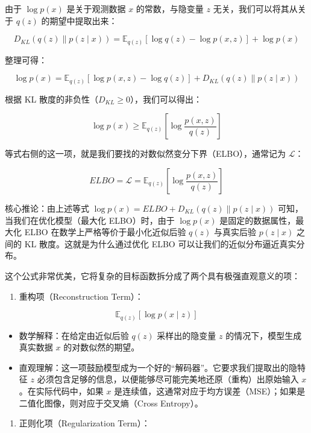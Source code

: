 由于 \(\log p(x)\) 是关于观测数据 \(x\) 的常数，与隐变量 \(z\) 无关，我们可以将其从关于 \(q(z)\) 的期望中提取出来：

\[
D_{KL}(q(z)\parallel p(z\mid x))=\mathbb{E}_{q(z)}[\log q(z)-\log p(x,z)]+\log p(x)
\]

整理可得：

\[
\log p(x)=\mathbb{E}_{q(z)}[\log p(x,z)-\log q(z)]+D_{KL}(q(z)\parallel p(z\mid x))
\]

根据 KL 散度的非负性（\(D_{KL}\ge 0\)），我们可以得出：

\[
\log p(x)\ge \mathbb{E}_{q(z)}\left[\log\frac{p(x,z)}{q(z)}\right]
\]

等式右侧的这一项，就是我们要找的对数似然变分下界（ELBO），通常记为 \(\mathcal{L}\)：

\[
ELBO=\mathcal{L}=\mathbb{E}_{q(z)}\left[\log\frac{p(x,z)}{q(z)}\right]
\]

核心推论：由上述等式 \(\log p(x)=ELBO+D_{KL}(q(z)\parallel p(z\mid x))\) 可知，当我们在优化模型（最大化 ELBO）时，由于 \(\log p(x)\) 是固定的数据属性，最大化 ELBO 在数学上严格等价于最小化近似后验 \(q(z)\) 与真实后验 \(p(z\mid x)\) 之间的 KL 散度。这就是为什么通过优化 ELBO 可以让我们的近似分布逼近真实分布。

这个公式非常优美，它将复杂的目标函数拆分成了两个具有极强直观意义的项：

\begin{enumerate}
\def\labelenumi{\arabic{enumi}.}
\tightlist
\item
  重构项（Reconstruction Term）：
\end{enumerate}

\[
\mathbb{E}_{q(z)}[\log p(x \mid z)]
\]

\begin{itemize}
\tightlist
\item
  数学解释：在给定由近似后验 \(q(z)\) 采样出的隐变量 \(z\) 的情况下，模型生成真实数据 \(x\) 的对数似然的期望。
\item
  直观理解：这一项鼓励模型成为一个好的``解码器''。它要求我们提取出的隐特征 \(z\) 必须包含足够的信息，以便能够尽可能完美地还原（重构）出原始输入 \(x\)。在实际代码中，如果 \(x\) 是连续值，这通常对应于均方误差（MSE）；如果是二值化图像，则对应于交叉熵（Cross Entropy）。
\end{itemize}

\begin{enumerate}
\def\labelenumi{\arabic{enumi}.}
\setcounter{enumi}{1}
\tightlist
\item
  正则化项（Regularization Term）：
\end{enumerate}

